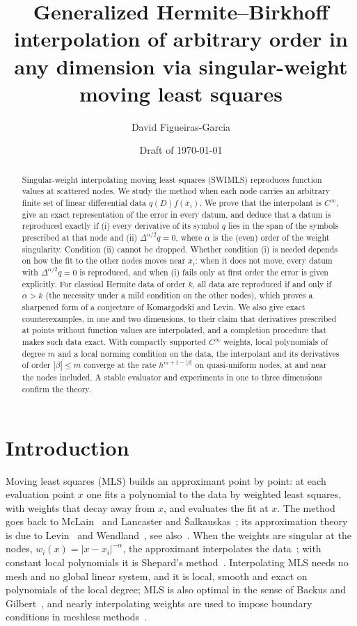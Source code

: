 \documentclass[12pt]{amsart}
\title[Hermite--Birkhoff interpolation by singular-weight MLS]{Generalized Hermite--Birkhoff
interpolation of arbitrary order in any dimension via singular-weight moving least squares}
\author{David Figueiras-Garcia}
\date{Draft of \today}
\theoremstyle{definition}
\theoremstyle{remark}
\begin{document}
\begin{abstract}
Singular-weight interpolating moving least squares (SWIMLS) reproduces function values at
scattered nodes. We study the method when each node carries an arbitrary finite set of linear
differential data $q(D)f(x_i)$. We prove that the interpolant is $C^\infty$, give an exact
representation of the error in every datum, and deduce that a datum is reproduced exactly if
(i) every derivative of its symbol $q$ lies in the span of the symbols prescribed at that node
and (ii) $\Delta^{\alpha/2}q=0$, where $\alpha$ is the (even) order of the weight singularity.
Condition (ii) cannot be dropped. Whether condition (i) is needed depends on how the fit to the
other nodes moves near $x_i$: when it does not move, every datum with $\Delta^{\alpha/2}q=0$ is
reproduced, and when (i) fails only at first order the error is given explicitly. For classical Hermite data of order $k$, all data are reproduced
if and only if $\alpha>k$ (the necessity under a mild condition on the other nodes), which
proves a sharpened form of a conjecture of Komargodski and Levin. We also give exact
counterexamples, in one and two dimensions, to their claim that derivatives prescribed at
points without function values are interpolated, and a completion procedure that makes such
data exact. With compactly supported $C^\infty$ weights, local polynomials of degree $m$ and a
local norming condition on the data, the interpolant and its derivatives of order
$|\beta|\le m$ converge at the rate $h^{m+1-|\beta|}$ on quasi-uniform nodes, at and near the
nodes included. A stable evaluator and
experiments in one to three dimensions confirm the theory.
\end{abstract}

\maketitle

\section{Introduction}\label{sec:intro}
Moving least squares (MLS) builds an approximant point by point: at each evaluation point $x$
one fits a polynomial to the data by weighted least squares, with weights that decay away from
$x$, and evaluates the fit at $x$. The method goes back to McLain~\cite{McLain1974,McLain1976}
and Lancaster and \v{S}alkauskas~\cite{LancasterSalkauskas1981}; its approximation theory is
due to Levin~\cite{Levin1998} and Wendland~\cite{Wendland2005}, see also~\cite{Fasshauer2007}.
When the weights are singular at the nodes, $w_i(x)=|x-x_i|^{-\alpha}$, the approximant
interpolates the data~\cite{LancasterSalkauskas1981}; with constant local polynomials it is
Shepard's method~\cite{Shepard1968}. Interpolating MLS needs no mesh and no global linear
system, and it is local, smooth and exact on polynomials of the local degree; MLS is also
optimal in the sense of Backus and Gilbert~\cite{BosSalkauskas1989}, and nearly interpolating
weights are used to impose boundary conditions in meshless methods~\cite{MostBucher2005}.
\end{document}
